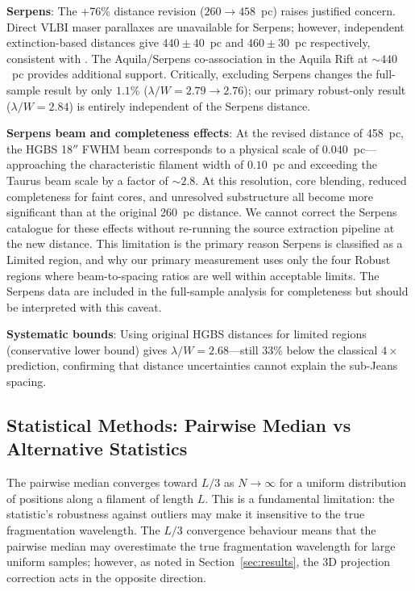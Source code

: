 \documentclass[twoside,twocolumn]{mnras}
\begin{document}
\textbf{Serpens}: The +76\% distance revision ($260 \to 458$~pc) raises justified
concern. Direct VLBI maser parallaxes are unavailable for Serpens; however, independent
extinction-based distances \citep{Yan2022, Green2024} give $440 \pm 40$~pc and
$460 \pm 30$~pc respectively, consistent with \citealt{Zhang2023}. The Aquila/Serpens
co-association in the Aquila Rift at ${\sim}440$~pc \citep{Zucker2020} provides
additional support. Critically, excluding Serpens changes the full-sample
result by only $1.1\%$ ($\lambda/W = 2.79 \to 2.76$); our primary robust-only
result ($\lambda/W = 2.84$) is entirely independent of the Serpens distance.

\textbf{Serpens beam and completeness effects}: At the revised distance of 458~pc,
the HGBS 18$''$ FWHM beam corresponds to a physical scale of $0.040$~pc---approaching
the characteristic filament width of $0.10$~pc and exceeding the Taurus beam scale by
a factor of $\sim 2.8$. At this resolution, core blending, reduced completeness for
faint cores, and unresolved substructure all become more significant than at the
original 260~pc distance. We cannot correct the Serpens catalogue for these effects
without re-running the source extraction pipeline at the new distance. This limitation
is the primary reason Serpens is classified as a Limited region, and why our primary
measurement uses only the four Robust regions where beam-to-spacing ratios are well
within acceptable limits. The Serpens data are included in the full-sample analysis for
completeness but should be interpreted with this caveat.

\textbf{Systematic bounds}: Using original HGBS distances for limited regions
(conservative lower bound) gives $\lambda/W = 2.68$---still 33\% below the classical
$4\times$ prediction, confirming that distance uncertainties cannot explain the
sub-Jeans spacing.

\subsection{Statistical Methods: Pairwise Median vs Alternative Statistics}
\label{sec:statistics}

The pairwise median converges toward $L/3$ as $N \to \infty$ for a uniform distribution
of positions along a filament of length $L$. This is a fundamental limitation: the
statistic's robustness against outliers may make it insensitive to the true fragmentation
wavelength. The $L/3$ convergence behaviour means that the pairwise median may overestimate the true
fragmentation wavelength for large uniform samples; however, as noted in
Section~\ref{sec:results}, the 3D projection correction acts in the opposite direction.
\end{document}
